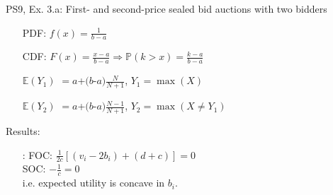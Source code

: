 \begin{frame}{PS9, Ex. 3.a: First- and second-price sealed bid auctions with two bidders}
\begin{multicols}{2}
\begin{enumerate}
        \item[PDF:] $f(x)=\frac{1}{b-a}$
        \item[CDF:] $F(x)=\frac{x-a}{b-a}\Rightarrow\mathbb{P}(k>x)=\frac{k-a}{b-a}$
        \item[$\mathbb{E}(Y_1)$] $=a$+$(b$-$a)\frac{N}{N+1}$, $Y_1=\max(X)$
        \item[$\mathbb{E}(Y_2)$] $=a$+$(b$-$a)\frac{N-1}{N+1}$, $Y_2=\max(X\neq Y_1)$
      \end{enumerate}
      \vspace{-6pt}
      Results:
      \vspace{-6pt}
      \begin{itemize}
        \item[\nth{2}:] FOC: $\frac{1}{2c}[(v_i-2b_i)+(d+c)]=0$\\
                        SOC: $-\frac{1}{c}=0$\\
                        i.e. expected utility is concave in $b_i$.
      \end{itemize}
      \vfill\null
    \end{multicols}
\end{frame}
